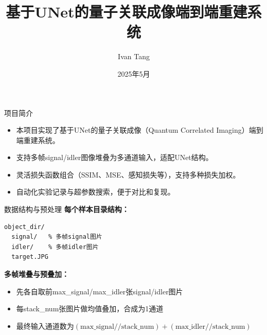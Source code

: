 \documentclass{beamer}
\title{基于UNet的量子关联成像端到端重建系统}
\author{Ivan Tang}
\date{2025年5月}
\begin{document}
\frame{\titlepage}

\begin{frame}{项目简介}
\begin{itemize}
    \item 本项目实现了基于UNet的量子关联成像（Quantum Correlated Imaging）端到端重建系统。
    \item 支持多帧signal/idler图像堆叠为多通道输入，适配UNet结构。
    \item 灵活损失函数组合（SSIM、MSE、感知损失等），支持多种损失加权。
    \item 自动化实验记录与超参数搜索，便于对比和复现。
\end{itemize}
\end{frame}

\begin{frame}{数据结构与预处理}
\textbf{每个样本目录结构：}
\begin{lstlisting}
object_dir/
  signal/   % 多帧signal图片
  idler/    % 多帧idler图片
  target.JPG
\end{lstlisting}
\vspace{0.5em}
\textbf{多帧堆叠与预叠加：}
\begin{itemize}
    \item 先各自取前max\_signal/max\_idler张signal/idler图片
    \item 每stack\_num张图片做均值叠加，合成为1通道
    \item 最终输入通道数为$(\text{max\_signal}//\text{stack\_num}) + (\text{max\_idler}//\text{stack\_num})$
\end{itemize}
\end{frame}
\end{document}
